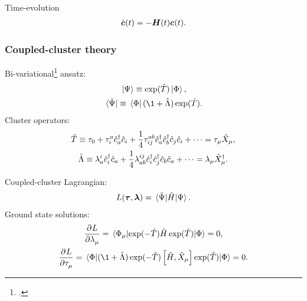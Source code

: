 \documentclass{beamer}
\begin{document}
\begin{frame}
    Time-evolution
    \begin{align}
        \dot{\boldsymbol{c}}(t) = -\boldsymbol{H}(t)\boldsymbol{c}(t).
    \end{align}
\end{frame}

\begin{frame}
    \frametitle{Coupled-cluster theory}
    Bi-variational\footcite{arponen1983311} ansatz:
    \begin{gather}
        \ket*{\Psi} \equiv \exponential(\clust)\ket*{\slat},
        \\
        \bra*{\tilde{\Psi}} \equiv
        \bra*{\slat}(\1 + \clustl)\exponential(\clust).
    \end{gather}
    Cluster operators:
    \begin{gather}
        \hat{T} \equiv \tau_0
        + \tau^{a}_{i}\hat{c}_{a}^{\dagger}\hat{c}_{i}
        + \frac{1}{4}\tau^{ab}_{ij}\hat{c}_{a}^{\dagger}\hat{c}_{b}^{\dagger}\hat{c}_{j}\hat{c}_{i}
        + \dots
        = \tau_{\mu}\hat{X}_{\mu},
        \\
        \hat{\Lambda} \equiv
        \lambda^{i}_{a}\hat{c}_{i}^{\dagger}\hat{c}_{a}
        + \frac{1}{4}\lambda^{ij}_{ab}\hat{c}_{i}^{\dagger}\hat{c}_{j}^{\dagger}\hat{c}_{b}\hat{c}_{a}
        + \dots
        = \lambda_{\mu}\hat{X}^{\dagger}_{\mu}.
    \end{gather}
\end{frame}

\begin{frame}
    Coupled-cluster Lagrangian:
    \begin{align}
        L(\boldsymbol{\tau}, \boldsymbol{\lambda})
        = \mel*{\tilde{\Psi}}{\hat{H}}{\Psi}.
    \end{align}
    Ground state solutions:
    \begin{gather}
        \dpd{L}{\clustlamp_{\mu}}
        = \mel*{\slat_{\mu}}{
            \exponential(-\clust)
            \hamil
            \exponential(\clust)
        }{\slat}
        = 0, \\
        \dpd{L}{\clustamp_{\mu}}
        = \mel*{\slat}{
            (\1 + \clustl)
            \exponential(-\clust)
            \com{\hamil}{\hat{X}_{\mu}}
            \exponential(\clust)
        }{\slat}
        = 0.
    \end{gather}
\end{frame}
\end{document}
